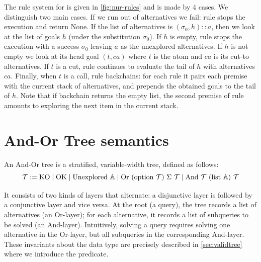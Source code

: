 The rule system for \runS is given in \cref{fig:nur-rules} and is made by $4$
cases. We distinguish two main cases. If we run out of alternatives
we fail: rule \fails stops the execution and return None.
If the list of alternatives is $(\sigma_0, h) :: a$, then
we look at the list of goals $h$ (under the substitution $\sigma_0$). If $h$ is empty, rule \stops stops the execution with a success $\sigma_0$
leaving $a$ as the unexplored alternatives.
If $h$ is not empty we look at its head goal $(t, ca)$ where $t$ is the atom and $ca$ is its
cut-to alternatives. If $t$ is a cut, rule
\cuts continues to evaluate the tail of $h$ with alternatives $ca$. Finally, when $t$ is a call, rule \calls backchains:
for each rule it pairs each premise with the current stack of
alternatives, and prepends the obtained goals to the tail of $h$.
Note that if backchain returns the empty list, the second
premise of rule \calls amounts to exploring the next item in the current
stack.

\section{And-Or Tree semantics}
\label{tree-sem}

An And-Or tree is a stratified, variable-width tree, defined as follows:
%
$$\TREE := \mathrm{KO} \mid \mathrm{OK} \mid \mathrm{Unexplored}\ \ATOM \mid \mathrm{Or}\ (\mathrm{option}\ \TREE)\ \Sigma\ \TREE \mid \mathrm{And}\ \TREE\ (\mathrm{list}\ \ATOM)\ \TREE$$

It consists of two kinds
of layers that alternate: a disjunctive layer is followed by a conjunctive
layer and vice versa. At the root (a query), the tree records a list of
alternatives (an Or-layer); for each alternative, it records a list of
subqueries to be solved (an And-layer). Intuitively, solving a query requires
solving one alternative in the Or-layer, but all subqueries in the
corresponding And-layer. These invariants about the \TREE data type
are precisely described in \cref{sec:validtree} where we introduce the
\vast predicate.


